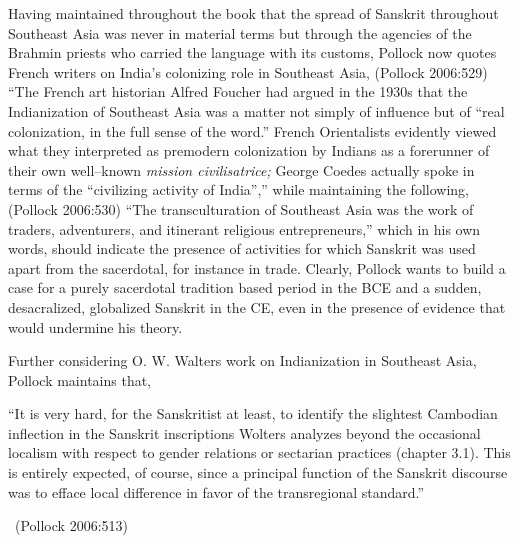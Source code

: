 Having maintained throughout the book that the spread of Sanskrit throughout Southeast Asia was never in material terms but through the agencies of the Brahmin priests who carried the language with its customs, Pollock now quotes French writers on India’s colonizing role in Southeast Asia, (Pollock 2006:529) “The French art historian Alfred Foucher had argued in the 1930s that the Indianization of Southeast Asia was a matter not simply of influence but of “real colonization, in the full sense of the word.” French Orientalists evidently viewed what they interpreted as premodern colonization by Indians as a forerunner of their own well–known \textit{mission civilisatrice;} George Coedes actually spoke in terms of the “civilizing activity of India”,” while maintaining the following, (Pollock 2006:530) “The transculturation of Southeast Asia was the work of traders, adventurers, and itinerant religious entrepreneurs,” which in his own words, should indicate the presence of activities for which Sanskrit was used apart from the sacerdotal, for instance in trade. Clearly, Pollock wants to build a case for a purely sacerdotal tradition based period in the BCE and a sudden, desacralized, globalized Sanskrit in the CE, even in the presence of evidence that would undermine his theory.

Further considering O. W. Walters work on Indianization in Southeast Asia, Pollock maintains that,

\begin{myquote}
“It is very hard, for the Sanskritist at least, to identify the slightest Cambodian inflection in the Sanskrit inscriptions Wolters analyzes beyond the occasional localism with respect to gender relations or sectarian practices (chapter 3.1). This is entirely expected, of course, since a principal function of the Sanskrit discourse was to efface local difference in favor of the transregional standard.” 

~\hfill (Pollock 2006:513)
\end{myquote}

